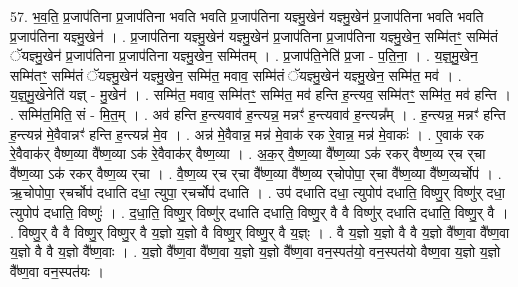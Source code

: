 \documentclass[17pt]{extarticle}
\begin{document}
57. भ॒व॒ति॒ प्र॒जाप॑तिना प्र॒जाप॑तिना भवति भवति प्र॒जाप॑तिना यज्ञ्मु॒खेन॑ यज्ञ्मु॒खेन॑ प्र॒जाप॑तिना भवति भवति प्र॒जाप॑तिना यज्ञ्मु॒खेन॑ । . प्र॒जाप॑तिना यज्ञ्मु॒खेन॑ यज्ञ्मु॒खेन॑ प्र॒जाप॑तिना प्र॒जाप॑तिना यज्ञ्मु॒खेन॒ सम्मि॑तꣳ॒॒ सम्मि॑तं ॅयज्ञ्मु॒खेन॑ प्र॒जाप॑तिना प्र॒जाप॑तिना यज्ञ्मु॒खेन॒ सम्मि॑तम् । . प्र॒जाप॑ति॒नेति॑ प्र॒जा - प॒ति॒ना॒ । . य॒ज्ञ्॒मु॒खेन॒ सम्मि॑तꣳ॒॒ सम्मि॑तं ॅयज्ञ्मु॒खेन॑ यज्ञ्मु॒खेन॒ सम्मि॑त॒ मवाव॒ सम्मि॑तं ॅयज्ञ्मु॒खेन॑ यज्ञ्मु॒खेन॒ सम्मि॑त॒ मव॑ । . य॒ज्ञ्॒मु॒खेनेति॑ यज्ञ् - मु॒खेन॑ । . सम्मि॑त॒ मवाव॒ सम्मि॑तꣳ॒॒ सम्मि॑त॒ मव॑ हन्ति ह॒न्त्यव॒ सम्मि॑तꣳ॒॒ सम्मि॑त॒ मव॑ हन्ति । . सम्मि॑त॒मिति॒ सं - मि॒त॒म् । . अव॑ हन्ति ह॒न्त्यवाव॑ ह॒न्त्यन्न॒ मन्नꣳ॑ ह॒न्त्यवाव॑ ह॒न्त्यन्न᳚म् । . ह॒न्त्यन्न॒ मन्नꣳ॑ हन्ति ह॒न्त्यन्न॑ मे॒वैवान्नꣳ॑ हन्ति ह॒न्त्यन्न॑ मे॒व । . अन्न॑ मे॒वैवान्न॒ मन्न॑ मे॒वाक॑ रक रे॒वान्न॒ मन्न॑ मे॒वाकः॑ । . ए॒वाक॑ रक रे॒वैवाक॑र् वैष्ण॒व्या वै᳚ष्ण॒व्या ऽक॑ रे॒वैवाक॑र् वैष्ण॒व्या । . अ॒क॒र् वै॒ष्ण॒व्या वै᳚ष्ण॒व्या ऽक॑ रकर् वैष्ण॒व्य र्‌च र्‌चा वै᳚ष्ण॒व्या ऽक॑ रकर् वैष्ण॒व्य र्‌चा । . वै॒ष्ण॒व्य र्‌च र्‌चा वै᳚ष्ण॒व्या वै᳚ष्ण॒व्य र्‌चोपोपा॒ र्‌चा वै᳚ष्ण॒व्या वै᳚ष्ण॒व्यर्चोप॑ । . ऋ॒चोपोपा॒ र्‌चर्चोप॑ दधाति दधा॒ त्युपा॒ र्‌चर्चोप॑ दधाति । . उप॑ दधाति दधा॒ त्युपोप॑ दधाति॒ विष्णु॒र् विष्णु॑र् दधा॒ त्युपोप॑ दधाति॒ विष्णुः॑ । . द॒धा॒ति॒ विष्णु॒र् विष्णु॑र् दधाति दधाति॒ विष्णु॒र् वै वै विष्णु॑र् दधाति दधाति॒ विष्णु॒र् वै । . विष्णु॒र् वै वै विष्णु॒र् विष्णु॒र् वै य॒ज्ञो य॒ज्ञो वै विष्णु॒र् विष्णु॒र् वै य॒ज्ञ्ः । . वै य॒ज्ञो य॒ज्ञो वै वै य॒ज्ञो वै᳚ष्ण॒वा वै᳚ष्ण॒वा य॒ज्ञो वै वै य॒ज्ञो वै᳚ष्ण॒वाः । . य॒ज्ञो वै᳚ष्ण॒वा वै᳚ष्ण॒वा य॒ज्ञो य॒ज्ञो वै᳚ष्ण॒वा वन॒स्पत॑यो॒ वन॒स्पत॑यो वैष्ण॒वा य॒ज्ञो य॒ज्ञो वै᳚ष्ण॒वा वन॒स्पत॑यः । \newline
\end{document}

